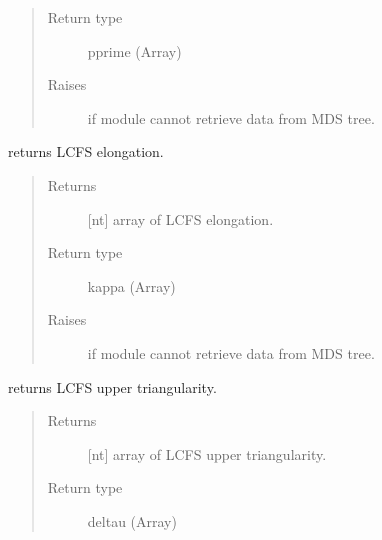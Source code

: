 \documentclass[letterpaper,10pt,english]{sphinxmanual}
\begin{document}
\begin{fulllineitems}
\begin{fulllineitems}
\begin{quote}
\begin{description}
\item[{Return type}] \leavevmode
pprime (Array)

\item[{Raises}] \leavevmode
{} \textendash{} if module cannot retrieve data from MDS tree.

\end{description}\end{quote}

\end{fulllineitems}


\begin{fulllineitems}
\label{\detokenize{eqtools:eqtools.EFIT.EFITTree.getElongation}}
returns LCFS elongation.
\begin{quote}\begin{description}
\item[{Returns}] \leavevmode
{[}nt{]} array of LCFS elongation.

\item[{Return type}] \leavevmode
kappa (Array)

\item[{Raises}] \leavevmode
{} \textendash{} if module cannot retrieve data from MDS tree.

\end{description}\end{quote}

\end{fulllineitems}


\begin{fulllineitems}
\label{\detokenize{eqtools:eqtools.EFIT.EFITTree.getUpperTriangularity}}
returns LCFS upper triangularity.
\begin{quote}\begin{description}
\item[{Returns}] \leavevmode
{[}nt{]} array of LCFS upper triangularity.

\item[{Return type}] \leavevmode
deltau (Array)


\end{description}
\end{quote}
\end{fulllineitems}
\end{fulllineitems}
\end{document}
